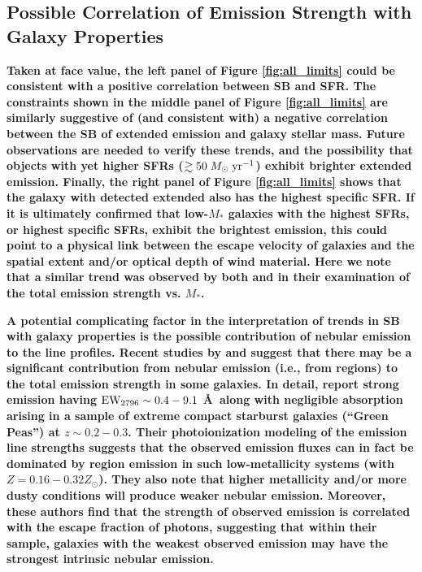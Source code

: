 \documentclass[trackchanges,twocolumn]{aastex62}
\def \msunperyr {{\; M_{\odot}\rm \;yr^{-1}}}
\begin{document}
\subsection{Possible Correlation of  Emission Strength with Galaxy Properties }
{\bf Taken at face value, the left panel of Figure \ref{fig:all_limits} could be consistent with a positive correlation between  SB and SFR. 
The constraints shown in the middle panel of Figure \ref{fig:all_limits} are similarly suggestive of (and consistent with) a negative correlation between the SB of extended  emission and galaxy stellar mass. 
Future observations are needed to verify these trends, and the possibility that objects with yet higher SFRs ($\gtrsim50 \msunperyr$) exhibit brighter extended  emission.  
Finally, the right panel of Figure \ref{fig:all_limits} shows that the galaxy with detected extended  also has the highest specific SFR. If it is ultimately confirmed that low-$M_*$ galaxies with the highest SFRs, or highest specific SFRs, exhibit the brightest emission, this could point to a physical link between the escape velocity of galaxies and the spatial extent and/or optical depth of wind material.
Here we note that a similar trend was observed by both \cite{Erb2012} and \cite{Feltre2018} in their examination of the total  emission strength vs. $M_*$. }

{\bf A potential complicating factor in the interpretation of trends in  SB with galaxy properties is the possible contribution of nebular emission to the  line profiles.
Recent studies by \cite{Henry2018} and \cite{Guseva2019} suggest that there may be a significant contribution from nebular emission (i.e., from  regions) to the total  emission strength in some galaxies. 
In detail, \cite{Henry2018} report strong  emission having %
$\rm EW_{2796}\sim 0.4-9.1$ \AA\ along with negligible absorption
arising in a sample of extreme compact starburst galaxies (``Green Peas'') at $z \sim 0.2-0.3$. 
Their photoionization modeling of the emission line strengths suggests that the observed 
 emission fluxes can in fact be 
dominated by  region emission in such low-metallicity systems (with $Z = 0.16-0.32 Z_{\odot}$).  They also note that higher metallicity and/or more dusty conditions will produce weaker nebular emission.  Moreover, these authors find that the strength of observed  emission is correlated with the escape fraction of  photons, suggesting that within their sample, galaxies with the weakest observed emission may have the strongest intrinsic nebular emission.   }
\end{document}
